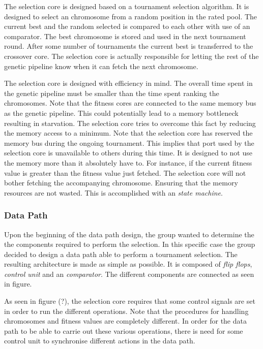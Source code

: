 The selection core is designed based on a tournament selection algorithm.
It is designed to select an chromosome from a random position in the rated pool.
The current best and the random selected is compared to each other with use of an comparator.
The best chromosome is stored and used in the next tournament round.
After some number of tournaments the current best is transferred to the crossover core.
The selection core is actually responsible for letting the rest of the genetic pipeline know when it can fetch the next chromosome. 

The selection core is designed with efficiency in mind.
The overall time spent in the genetic pipeline must be smaller than the time spent ranking the chromosomes.
Note that the fitness cores are connected to the same memory bus as the genetic pipeline.
This could potentially lead to a memory bottleneck resulting in starvation.
The selection core tries to overcome this fact by reducing the memory access to a minimum.
Note that the selection core has reserved the memory bus during the ongoing tournament.
This implies that port used by the selection core is unavailable to others during this time.
It is designed to not use the memory more than it absolutely have to.
For instance, if the current fitness value is greater than the fitness value just fetched.
The selection core will not bother fetching the accompanying chromosome.
Ensuring that the memory resources are not wasted.
This is accomplished with an \emph{state machine}. 



\subsubsection{Data Path}
Upon the beginning of the data path design, the group wanted to determine the the components required to perform the selection.
In this specific case the group decided to design a data path able to perform a tournament selection.
The resulting architecture is made as simple as possible.
It is composed of \emph{flip flops}, \emph{control unit} and an \emph{comparator}.
The different components are connected as seen in figure.

As seen in figure (?), the selection core requires that some control signals are set in order to run the different operations.
Note that the procedures for handling chromosomes and fitness values are completely different.
In order for the data path to be able to carrie out these various operations, there is need for some control unit to synchronise different actions in the data path. 



